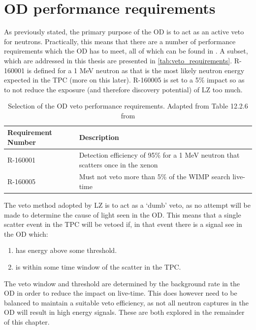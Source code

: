 \section{OD performance requirements}
\label{sec:simulated_od_requirements}
\par
As previously stated, the primary purpose of the OD is to act as an active veto for neutrons.
Practically, this means that there are a number of performance requirements which the OD has to meet, all of which can be found in \cite{LZ_TechnicalDesignReview_ref}.
A subset, which are addressed in this thesis are presented in \autoref{tab:veto_requirements}.
R-160001 is defined for a 1 MeV neutron as that is the most likely neutron energy expected in the TPC (more on this later).
R-160005 is set to a 5\% impact so as to not reduce the exposure (and therefore discovery potential) of LZ too much.
\begin{table}[]
    \centering
    \begin{tabular}{p{}p{}} %
    \hline
    {Requirement Number} & {Description} \\ \hline
    R-160001             & Detection efficiency of 95\% for a 1 MeV neutron that scatters once in the xenon \\
    R-160005             & Must not veto more than 5\% of the WIMP search live-time
    \end{tabular}
    \caption{Selection of the OD veto performance requirements. Adapted from Table 12.2.6 from \cite{LZ_TechnicalDesignReview_ref}}
    \label{tab:veto_requirements}
\end{table} 

\par
The veto method adopted by LZ is to act as a `dumb' veto, as no attempt will be made to determine the cause of light seen in the OD.
This means that a single scatter event in the TPC will be vetoed if, in that event there is a signal see in the OD which:
\begin{enumerate}
    \item has energy above some threshold.
    \item is within some time window of the scatter in the TPC. 
\end{enumerate}
The veto window and threshold are determined by the background rate in the OD in order to reduce the impact on live-time.
This does however need to be balanced to maintain a suitable veto efficiency, as not all neutron captures in the OD will result in high energy signals.
These are both explored in the remainder of this chapter.


